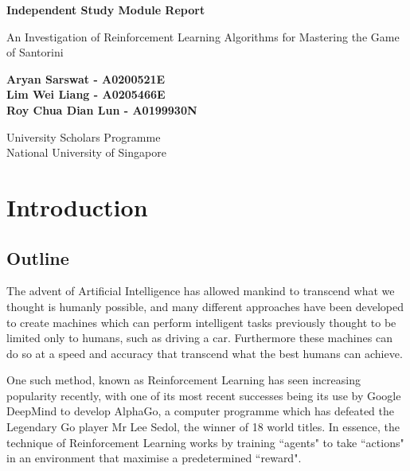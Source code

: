 \documentclass[a4paper,12pt,table]{article}
\begin{document}
\begin{titlepage}
   \begin{center}
       \vspace*{6cm}

       \textbf{{\Huge Independent Study Module Report}}

	\vspace{5cm}

 {\Large An Investigation of Reinforcement Learning Algorithms for Mastering the Game of Santorini}

       \vspace{0.5cm}

       \vspace{1.5cm}


       \vfill



       \textbf{Aryan Sarswat -  A0200521E \\
		Lim Wei Liang - A0205466E \\
		Roy Chua Dian Lun - A0199930N \\ }

       \vspace{0.8cm}

      University Scholars Programme\\
       National University of Singapore\\

   \end{center}
\end{titlepage}


\tableofcontents
\newpage


\section{Introduction}

\subsection{Outline}

The advent of Artificial Intelligence has allowed mankind to transcend what we thought is humanly possible, and many different approaches have been developed to create machines which can perform intelligent tasks previously thought to be limited only to humans, such as driving a car. Furthermore these machines can do so at a speed and accuracy that transcend what the best humans can achieve. \par

One such method, known as Reinforcement Learning has seen increasing popularity recently, with one of its most recent successes being its use by Google DeepMind to develop AlphaGo, a computer programme which has defeated the Legendary Go player Mr Lee Sedol, the winner of 18 world titles. In essence, the technique of Reinforcement Learning works by training “agents" to take “actions" in an environment that maximise a predetermined “reward".
\end{document}
